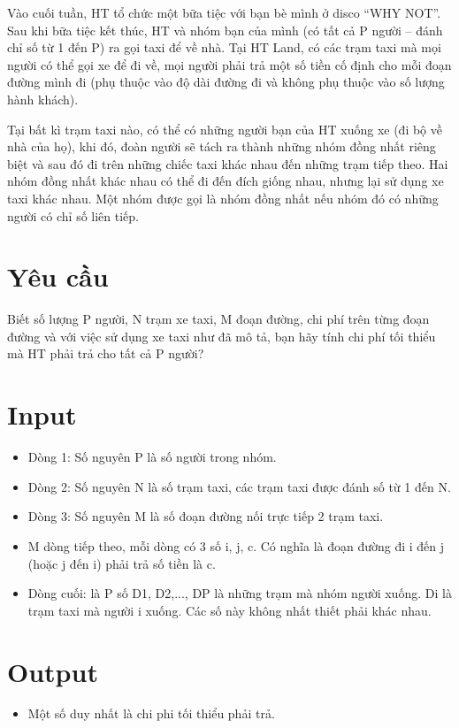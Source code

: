



   Vào cuối tuần, HT tổ chức một bữa tiệc với bạn bè mình ở disco “WHY NOT”. Sau khi bữa tiệc kết thúc, HT và nhóm bạn của mình (có tất cả P người – đánh chỉ số từ 1 đến P) ra gọi taxi để về nhà. Tại HT Land, có các trạm taxi mà mọi người có thể gọi xe để đi về, mọi người phải trả một số tiền cố định cho mỗi đoạn đường mình đi (phụ thuộc vào độ dài đường đi và không phụ thuộc vào số lượng hành khách).  

   Tại bất kì trạm taxi nào, có thể có những người bạn của HT xuống xe (đi bộ về nhà của họ), khi đó, đoàn người sẽ tách ra thành những       nhóm đồng nhất      riêng biệt và sau đó đi trên những chiếc taxi khác nhau đến những trạm tiếp theo. Hai nhóm đồng nhất khác nhau có thể đi đến đích giống nhau, nhưng lại sử dụng xe taxi khác nhau. Một nhóm được gọi là nhóm đồng nhất nếu nhóm đó có những người có chỉ số liên tiếp.  

\section{   Yêu cầu  }

   Biết số lượng P người, N trạm xe taxi, M đoạn đường, chi phí trên từng đoạn đường và với việc sử dụng xe taxi như đã mô tả, bạn hãy tính chi phí tối thiểu mà HT phải trả cho tất cả P người?  

\section{   Input  }
\begin{itemize}
	\item     Dòng 1: Số nguyên P là số người trong nhóm.   
	\item     Dòng 2: Số nguyên N là số trạm taxi, các trạm taxi được đánh số từ 1 đến N.   
	\item     Dòng 3: Số nguyên M là số đoạn đường nối trực tiếp 2 trạm taxi.   
	\item     M dòng tiếp theo, mỗi dòng có 3 số i, j, c. Có nghĩa là đoạn đường đi i đến j (hoặc j đến i) phải trả số tiền là c.   
	\item     Dòng cuối: là P số D1, D2,..., DP là những trạm mà nhóm người xuống. Di là trạm taxi mà người i xuống. Các số này không nhất thiết phải khác nhau.   
\end{itemize}

\section{   Output  }
\begin{itemize}
	\item     Một số duy nhất là chi phi tối thiểu phải trả.   
\end{itemize}

